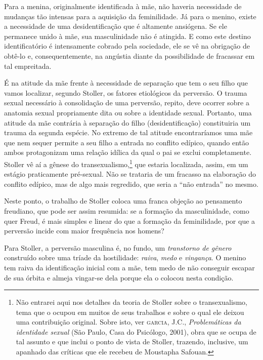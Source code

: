 Para a menina, originalmente identificada à mãe, não haveria necessidade
de mudanças tão intensas para a aquisição da feminilidade. Já para o
menino, existe a necessidade de uma desidentificação que é altamente
ansiógena. Se ele permanece unido à mãe, sua masculinidade não é
atingida. E como este destino identificatório é intensamente cobrado
pela sociedade, ele se vê na obrigação de obtê-lo e, consequentemente,
na angústia diante da possibilidade de fracassar em tal empreitada.

É na atitude da mãe frente à necessidade de separação que tem o seu
filho que vamos localizar, segundo Stoller, os fatores etiológicos da
perversão. O trauma sexual necessário à consolidação de uma perversão,
repito, deve ocorrer sobre a anatomia sexual propriamente dita ou sobre
a identidade sexual. Portanto, uma atitude da mãe contrária à separação
do filho (desidentificação) constituiria um trauma da segunda espécie.
No extremo de tal atitude encontraríamos uma mãe que nem sequer permite
a seu filho a entrada no conflito edípico, quando então ambos
protagonizam uma relação idílica da qual o pai se exclui completamente.
Stoller vê aí a gênese do transexualismo,\footnote{Não entrarei aqui nos
  detalhes da teoria de Stoller sobre o transexualismo, tema que o
  ocupou em muitos de seus trabalhos e sobre o qual ele deixou uma
  contribuição original. Sobre isto, ver \textsc{garcia}, J.C.,
  \emph{Problemáticas da identidade sexual} (São Paulo, Casa do
  Psicólogo, 2001), obra que se ocupa de tal assunto e que inclui o
  ponto de vista de Stoller, trazendo, inclusive, um apanhado das
  críticas que ele recebeu de Moustapha Safouan.} que estaria
localizada, assim, em um estágio praticamente pré-sexual. Não se
trataria de um fracasso na elaboração do conflito edípico, mas de algo
mais regredido, que seria a ``não entrada'' no mesmo.

Neste ponto, o trabalho de Stoller coloca uma franca objeção ao
pensamento freudiano, que pode ser assim resumida: se a formação da
masculinidade, como quer Freud, é mais simples e linear do que a
formação da feminilidade, por que a perversão incide com maior
frequência nos homens?

Para Stoller, a perversão masculina é, no fundo, um \emph{transtorno de
gênero} construído sobre uma tríade da hostilidade: \emph{raiva},
\emph{medo} e \emph{vingança}. O menino tem raiva da identificação
inicial com a mãe, tem medo de não conseguir escapar de sua órbita e
almeja vingar-se dela porque ela o colocou nesta condição.

